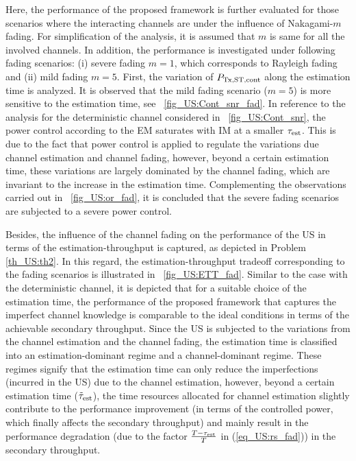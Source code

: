 Here, the performance of the proposed framework is further evaluated for those scenarios where the interacting channels are under the influence of Nakagami-$m$ fading. For simplification of the analysis, it is assumed that $m$ is same for all the involved channels. In addition, the performance is investigated under following fading scenarios: (i) severe fading $m=1$, which corresponds to Rayleigh fading
and (ii) mild fading $m = 5$. First, the variation of $P_{\text{Tx,ST,cont}}$ along the estimation time is analyzed. It is observed that the mild fading scenario ($m = 5$) is more sensitive to the estimation time, see \figurename~\ref{fig_US:Cont_snr_fad}. In reference to the analysis for the deterministic channel considered in \figurename~\ref{fig_US:Cont_snr}, the power control according to the EM saturates with IM at a smaller $\tau_{\text{est}}$. This is due to the fact that power control is applied to regulate the variations due channel estimation and channel fading, however, beyond a certain estimation time, these variations are largely dominated by the channel fading, which are invariant to the increase in the estimation time. Complementing the observations carried out in \figurename~\ref{fig_US:or_fad}, it is concluded that the severe fading scenarios are subjected to a severe power control.
 

Besides, the influence of the channel fading on the performance of the US in terms of the estimation-throughput is captured, as depicted in Problem \ref{th_US:th2}. In this regard, the estimation-throughput tradeoff corresponding to the fading scenarios is illustrated in \figurename~\ref{fig_US:ETT_fad}. Similar to the case with the deterministic channel, it is depicted that for a suitable choice of the estimation time, the performance of the proposed framework that captures the imperfect channel knowledge is comparable to the ideal conditions in terms of the achievable secondary throughput. Since the US is subjected to the variations from the channel estimation and the channel fading, the estimation time is classified into an estimation-dominant regime and a channel-dominant regime. These regimes signify that the estimation time can only reduce the imperfections (incurred in the US) due to the channel estimation, however, beyond a certain estimation time ($\tilde{\tau}_{\text{est}}$), the time resources allocated for channel estimation slightly contribute to the performance improvement (in terms of the controlled power, which finally affects the secondary throughput) and mainly result in the performance degradation (due to the factor $\frac{T - \tau_{\text{est}}}{T}$ in (\ref{eq_US:rs_fad})) in the secondary throughput. 

